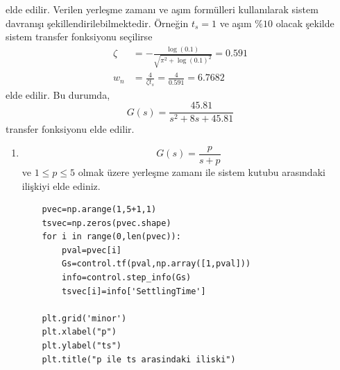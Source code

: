 elde edilir. Verilen yerleşme zamanı ve aşım formülleri kullanılarak sistem davranışı şekillendirilebilmektedir. Örneğin $t_s=1$ ve aşım $\%10$ olacak şekilde sistem transfer fonksiyonu seçilirse
\begin{equation} 
\begin{split} 
    \zeta&=-\frac{\log(0.1)}{\sqrt{\pi^2+\log(0.1)^2}}=0.591\\
    w_n&=\frac{4}{\zeta t_s}=\frac{4}{0.591}=6.7682
\end{split} 
\end{equation} 
elde edilir. Bu durumda,
\begin{equation} 
    G(s)=\frac{45.81}{s^2+8s+45.81}
\end{equation} 
transfer fonksiyonu elde edilir. 
\begin{enumerate}
    \item 
    \begin{equation}
        G(s)=\frac{p}{s+p}\label{eqn:first_order}
    \end{equation}
    ve $1\leq p\leq 5$ olmak üzere yerleşme zamanı ile sistem kutubu arasındaki ilişkiyi elde ediniz.
    \begin{lstlisting}
    pvec=np.arange(1,5+1,1)
    tsvec=np.zeros(pvec.shape)
    for i in range(0,len(pvec)):
        pval=pvec[i]
        Gs=control.tf(pval,np.array([1,pval]))
        info=control.step_info(Gs)
        tsvec[i]=info['SettlingTime']

    plt.grid('minor')
    plt.xlabel("p")
    plt.ylabel("ts")
    plt.title("p ile ts arasindaki iliski")


\end{lstlisting}
\end{enumerate}
